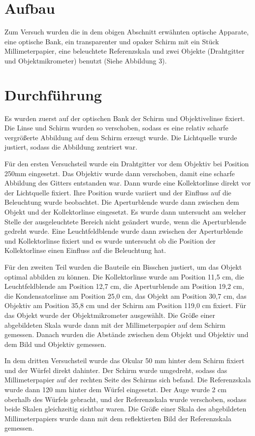 \documentclass[11pt,a4paper]{article}
\begin{document}
\section{Aufbau}
Zum Versuch wurden die in dem obigen Abschnitt erwähnten optische Apparate, eine optische Bank, ein transparenter und opaker Schirm mit ein Stück Millimeterpapier, eine beleuchtete Referenzskala und zwei Objekte (Drahtgitter und Objektmikrometer) benutzt (Siehe Abbildung 3). 

\section{Durchführung}
Es wurden zuerst auf der optischen Bank der Schirm und Objektivelinse fixiert. Die Linse und Schirm wurden so verschoben, sodass es eine relativ scharfe vergrößerte Abbildung auf dem Schirm erzeugt wurde. Die Lichtquelle wurde justiert, sodass die Abbildung zentriert war.  

Für den ersten Versuchsteil wurde ein Drahtgitter vor dem Objektiv bei Position 250mm eingesetzt. Das Objektiv wurde dann verschoben, damit eine scharfe Abbildung des Gitters entstanden war. Dann wurde eine Kollektorlinse direkt vor der Lichtquelle fixiert. Ihre Position wurde variiert und der Einfluss auf die Beleuchtung wurde beobachtet. Die Aperturblende wurde dann zwischen dem Objekt und der Kollektorlinse eingesetzt. Es wurde dann untersucht am welcher Stelle der ausgeleuchtete Bereich nicht geändert wurde, wenn die Aperturblende gedreht wurde. Eine Leuchtfeldblende wurde dann zwischen der Aperturblende und Kollektorlinse fixiert und es wurde untersucht ob die Position der Kollektorlinse einen Einfluss auf die Beleuchtung hat. 

Für den zweiten Teil wurden die Bauteile ein Bisschen justiert, um das Objekt optimal abbilden zu können. Die Kollektorlinse wurde am Position 11,5 cm, die Leuchtfeldblende am Position 12,7 cm, die Aperturblende am Position 19,2 cm, die Kondensatorlinse am Position 25,0 cm, das Objekt am Position 30,7 cm, das Objektiv am Position 35,8 cm und der Schirm am Position 119,0 cm fixiert. Für das Objekt wurde der Objektmikrometer ausgewählt. Die Größe einer abgebildeten Skala wurde dann mit der Millimeterpapier auf dem Schirm gemessen. Danach wurden die Abstände zwischen dem Objekt und Objektiv und dem Bild und Objektiv gemessen. 

In dem dritten Versuchsteil wurde das Okular 50 mm hinter dem Schirm fixiert und der Würfel direkt dahinter. Der Schirm wurde umgedreht, sodass das Millimeterpapier auf der rechten Seite des Schirms sich befand. Die Referenzskala wurde dann 120 mm hinter dem Würfel eingesetzt. Der Auge wurde 2 cm oberhalb des Würfels gebracht, und der Referenzskala wurde verschoben, sodass beide Skalen gleichzeitig sichtbar waren. Die Größe einer Skala des abgebildeten Millimeterpapiers wurde dann mit dem reflektierten Bild der Referenzskala gemessen. 
\end{document}
